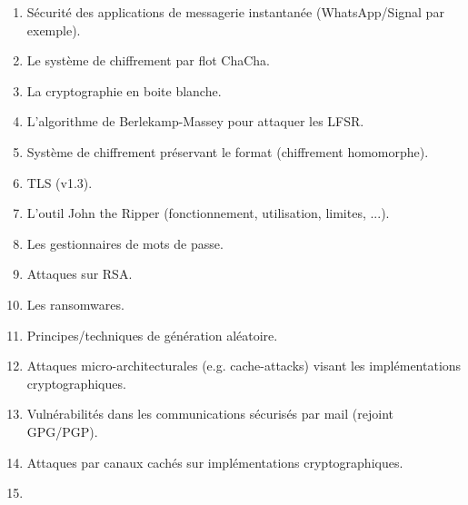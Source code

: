 \documentclass[french,a4paper,11pt]{exam}
\begin{document}
\begin{enumerate}
\item Sécurité des applications de messagerie instantanée (WhatsApp/Signal par exemple).
\item Le système de chiffrement par flot ChaCha.
\item La cryptographie en boite blanche.
\item L’algorithme de Berlekamp-Massey pour attaquer les LFSR.
\item Système de chiffrement préservant le format (chiffrement homomorphe).
\item TLS (v1.3).
\item L’outil John the Ripper (fonctionnement, utilisation, limites, ...).
\item Les gestionnaires de mots de passe.
\item Attaques sur RSA.
\item Les ransomwares.
\item Principes/techniques de génération aléatoire.
\item Attaques micro-architecturales (e.g. cache-attacks) visant les implémentations cryptographiques.
\item Vulnérabilités dans les communications sécurisés par mail (rejoint GPG/PGP).
\item Attaques par canaux cachés sur implémentations cryptographiques.
\item <insérez votre super bonne idée ici>
\end{enumerate}
\end{document}
